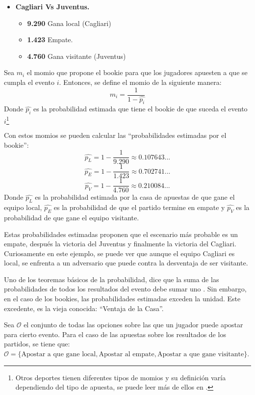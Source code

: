 \begin{enumerate}
\begin{itemize}
 \item \textbf{Cagliari Vs Juventus.}
  \begin{itemize}
    \item \textbf{9.290} Gana local (Cagliari)
    \item \textbf{1.423} Empate.
    \item \textbf{4.760} Gana visitante (Juventus)
  \end{itemize}
 \end{itemize}

  Sea $m_i$ el momio que propone el bookie para que los jugadores apuesten a que se cumpla el evento $i$. Entonces, se define el momio de la siguiente manera:
 \[m_i = \frac{1}{1 - \hat{p_i}}\]
 Donde $\hat{p_i}$ es la probabilidad estimada que tiene el bookie de que suceda el evento $i$\footnote{Otros deportes tienen diferentes tipos de momios y su definición varía dependiendo del tipo de apuesta, se puede leer más de ellos en \cite{ignatin1984sports}.}

 Con estos momios se pueden calcular las ``probabilidades estimadas por el bookie'':
 \[\hat{p_L} = 1 - \frac{1}{9.290} \approx 0.107643...\] 
 \[\hat{p_E} = 1 - \frac{1}{1.423} \approx 0.702741...\]
 \[\hat{p_V} = 1 - \frac{1}{4.760} \approx 0.210084...\]
 Donde $\hat{p_L}$ es la probabilidad estimada por la casa de apuestas de que gane el equipo local, $\hat{p_E}$ es la probabilidad de que el partido termine en empate y $\hat{p_V}$ es la probabilidad de que gane el equipo visitante.
 
 Estas probabilidades estimadas proponen que el escenario más probable es un empate, después la victoria del Juventus y finalmente la victoria del Cagliari. Curiosamente en este ejemplo, se puede ver que aunque el equipo Cagliari es local, se enfrenta a un adversario que puede contra la desventaja de ser visitante.

 Uno de los teoremas básicos de la probabilidad, dice que la suma de las probabilidades de todos los resultados del evento debe sumar uno \cite{ross2006first}. Sin embargo, en el caso de los bookies, las probabilidades estimadas exceden la unidad. Este excedente, es la vieja conocida: ``Ventaja de la Casa''.

 Sea $\mathcal{O}$ el conjunto de todas las opciones sobre las que un jugador puede apostar para cierto evento. Para el caso de las apuestas sobre los resultados de los partidos, se tiene que: $\mathcal{O} = \{\text{Apostar a que gane local}, \text{Apostar al empate}, \text{Apostar a que gane visitante}\}$.


\end{enumerate}
